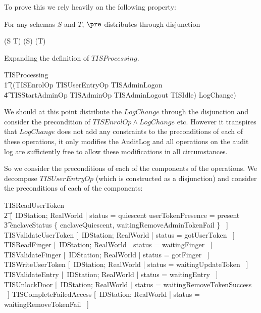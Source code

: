 To prove this we rely heavily on the following property:

For any schemas $S$ and $T$, $\pre$ distributes through disjunction
\begin{argue}
\pre(S \lor T) \equiv (\pre S) \lor (\pre T)
\end{argue}

Expanding the definition of $TISProcessing$.

\begin{argue}
\pre TISProcessing
\\  \t1 \equiv 
 \pre ((TISEnrolOp \lor TISUserEntryOp \lor TISAdminLogon 
\\ \t4                  \lor TISStartAdminOp \lor  TISAdminOp \lor
TISAdminLogout \lor TISIdle) \land LogChange) 
\end{argue}

We should at this point distribute the $LogChange$ through the
disjunction and consider the precondition of $TISEnrolOp \land
LogChange$ etc. However it transpires that $LogChange$ does not add
any constraints to the preconditions of each of these operations, it
only modifies the AuditLog and all operations on the audit log are
sufficiently free to allow these modifications in all circumstances.

So we consider the preconditions of each of the components of the
operations. We decompose $TISUserEntryOp$ (which is constructed as a
disjunction) and consider the
preconditions of each of the components:

\begin{argue}
        \pre TISReadUserToken \equiv 
\\      \t2 [~IDStation; RealWorld |
    status = quiescent \land userTokenPresence = present 
\\ \t3          \land enclaveStatus \in 
                \{ enclaveQuiescent, waitingRemoveAdminTokenFail \} ~]
\also
        \pre TISValidateUserToken \equiv 
 [~IDStation; RealWorld | status = gotUserToken  ~]
\also
        \pre TISReadFinger \equiv 
[~IDStation; RealWorld | status = waitingFinger  ~]
\also
        \pre TISValidateFinger \equiv 
[~IDStation; RealWorld | status = gotFinger  ~]
\also
        \pre TISWriteUserToken \equiv 
[~IDStation; RealWorld | status = waitingUpdateToken  ~]
\also
        \pre TISValidateEntry \equiv 
[~IDStation; RealWorld | status = waitingEntry  ~]
\also
        \pre TISUnlockDoor \equiv 
[~IDStation; RealWorld | status = waitingRemoveTokenSuccess  ~]
\also
        \pre TISCompleteFailedAccess \equiv 
[~IDStation; RealWorld | status = waitingRemoveTokenFail  ~]
\end{argue}

